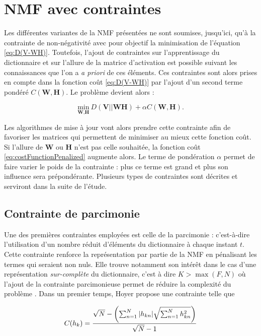 \section{NMF avec contraintes}\label{part:NMF_contrainte}
Les différentes variantes de la NMF présentées ne sont soumises, jusqu'ici, qu'à la contrainte de non-négativité avec pour objectif la minimisation de l'équation \ref{eq:D(V-WH)}. Toutefois, l'ajout de contraintes sur l'apprentissage du dictionnaire et sur l'allure de la matrice d'activation est possible suivant les connaissances que l'on a \textit{a priori} de ces éléments. Ces contraintes sont alors prises en compte dans la fonction coût \ref{eq:D(V-WH)} par l'ajout d'un second terme pondéré $C(\mathbf{W},\mathbf{H})$. Le problème devient alors :

\begin{equation}\label{eq:costFunctionPenalized}
\underset{\textbf{W},\textbf{H}}{\text{min}}~D\left(\textbf{V} \vert\vert \textbf{WH}\right) + \alpha C(\mathbf{W},\mathbf{H}).
\end{equation}

Les algorithmes de mise à jour vont alors prendre cette contrainte afin de favoriser les matrices qui permettent de minimiser au mieux cette fonction coût. Si l'allure de $\mathbf{W}$ ou $\mathbf{H}$ n'est pas celle souhaitée, la fonction coût \ref{eq:costFunctionPenalized} augmente alors. Le terme de pondération $\alpha$ permet de faire varier le poids de la contrainte : plus ce terme est grand et plus son influence sera prépondérante. Plusieurs types de contraintes sont décrites et serviront dans la suite de l'étude.

\subsection{Contrainte de parcimonie}
Une des premières contraintes employées est celle de la parcimonie \cite{hoyer_non-negative_2004, le2015sparse} : c'est-à-dire l'utilisation d'un nombre réduit d'éléments du dictionnaire à chaque instant $t$. Cette contrainte renforce la représentation par partie de la NMF en pénalisant les termes qui seraient non nuls. Elle trouve notamment son intérêt dans le cas d'une représentation \textit{sur-complète} du dictionnaire, c'est à dire $K > \max(F,N)$ où l'ajout de la contrainte parcimonieuse permet de réduire la complexité du problème \cite{eggert2004sparse}. Dans un premier temps, Hoyer \cite{hoyer_non-negative_2004} propose une contrainte telle que

\begin{equation}
C(h_k) = \frac{\sqrt{N}-\left( \sum_{n=1}^N \vert h_{kn} \vert \/ \sqrt{\sum_{n = 1}^N h_{kn}^2} \right)}{\sqrt{N}-1}
\end{equation}

